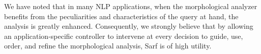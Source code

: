 \documentclass[11pt]{article}
\begin{document}
%
%
We have noted that in many NLP applications, when the morphological analyzer
benefits from the peculiarities and characteristics of the query at hand, 
the analysis %
is greatly 
enhanced. 
Consequently, we strongly believe that by 
allowing
an application-specific %
controller to intervene at every decision to guide, use, order, and 
refine the morphological analysis, Sarf is of high utility.
\end{document}

